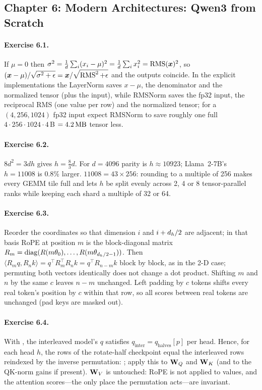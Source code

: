 \subsection*{Chapter 6: Modern Architectures: Qwen3 from Scratch}

\paragraph{Exercise 6.1.}
If $\mu=0$ then $\sigma^2=\tfrac1d\sum_i(x_i-\mu)^2=\tfrac1d\sum_i x_i^2=\operatorname{RMS}(\bm{x})^2$, so
$(\bm{x}-\mu)/\sqrt{\sigma^2+\epsilon}=\bm{x}/\sqrt{\operatorname{RMS}^2+\epsilon}$ and the outputs coincide.
In the explicit implementations the LayerNorm saves $x-\mu$, the denominator and the normalized
tensor (plus the input), while RMSNorm saves the fp32 input, the reciprocal RMS (one value per row)
and the normalized tensor; for a $(4,256,1024)$ fp32 input expect RMSNorm to save roughly one full
$4\cdot256\cdot1024\cdot4$\,B $=\SI{4.2}{\mega\byte}$ tensor less.

\paragraph{Exercise 6.2.}
$8d^2=3dh$ gives $h=\tfrac83d$. For $d=4096$ parity is $h\approx10923$; Llama~2-7B's $h=11008$ is
0.8\% larger. $11008=43\times256$: rounding to a multiple of 256 makes every GEMM tile full and lets
$h$ be split evenly across 2, 4 or 8 tensor-parallel ranks while keeping each shard a multiple of 32
or 64.

\paragraph{Exercise 6.3.}
Reorder the coordinates so that dimension $i$ and $i+d_{h}/2$ are adjacent; in that basis RoPE at
position $m$ is the block-diagonal matrix $R_m=\mathrm{diag}(R(m\theta_0),\ldots,R(m\theta_{d_{h}/2-1}))$.
Then $\langle R_mq,R_nk\rangle=q^\top R_m^\top R_nk=q^\top R_{n-m}k$ block by block, as in the 2-D
case; permuting both vectors identically does not change a dot product. Shifting $m$ and $n$ by the
same $c$ leaves $n-m$ unchanged. Left padding by $c$ tokens shifts every real token's position by $c$
within that row, so all scores between real tokens are unchanged (pad keys are masked out).

\paragraph{Exercise 6.4.}
With , the interleaved model's $q$ satisfies
$q_\text{inter}=q_\text{halves}[p]$ per head. Hence, for each head $h$, the rows
 of the rotate-half checkpoint equal the interleaved rows reindexed by the
inverse permutation: ; apply this to $\mathbf{W}_Q$
and $\mathbf{W}_K$ (and to the QK-norm gains if present). $\mathbf{W}_V$ is untouched: RoPE is not applied to
values, and the attention scores---the only place the permutation acts---are invariant.

